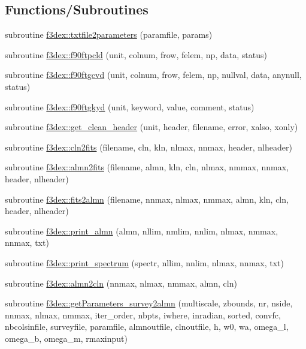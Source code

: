 \subsection*{Functions/Subroutines}
\begin{DoxyCompactItemize}
\item 
subroutine \hyperlink{namespacef3dex_a4e944841262cc3bac00e25f2d188804d}{f3dex::txtfile2parameters} (paramfile, params)
\item 
subroutine \hyperlink{namespacef3dex_a1c162e19667698db3dad6391a9bcd797}{f3dex::f90ftpcld} (unit, colnum, frow, felem, np, data, status)
\item 
subroutine \hyperlink{namespacef3dex_a8bb386e1b869c35df30978b7e634b234}{f3dex::f90ftgcvd} (unit, colnum, frow, felem, np, nullval, data, anynull, status)
\item 
subroutine \hyperlink{namespacef3dex_abb1777616669f320b1792a0e8aba490a}{f3dex::f90ftgkyd} (unit, keyword, value, comment, status)
\item 
subroutine \hyperlink{namespacef3dex_a11254efdbb3dec3e0a04346a3b4420b7}{f3dex::get\_\-clean\_\-header} (unit, header, filename, error, xalso, xonly)
\item 
subroutine \hyperlink{namespacef3dex_a9973d07e7dbafd1082de1d3b37088668}{f3dex::cln2fits} (filename, cln, kln, nlmax, nnmax, header, nlheader)
\item 
subroutine \hyperlink{namespacef3dex_a11f3efc39a60c9d26a79c13bfe936ebc}{f3dex::almn2fits} (filename, almn, kln, cln, nlmax, nmmax, nnmax, header, nlheader)
\item 
subroutine \hyperlink{namespacef3dex_a6630d20765692f55b9c5389e877e35ae}{f3dex::fits2almn} (filename, nnmax, nlmax, nmmax, almn, kln, cln, header, nlheader)
\item 
subroutine \hyperlink{namespacef3dex_aa083709f672c84c29ddbe82767394723}{f3dex::print\_\-almn} (almn, nllim, nmlim, nnlim, nlmax, nmmax, nnmax, txt)
\item 
subroutine \hyperlink{namespacef3dex_ac047f1cdd1135ef77143db2f2dc67259}{f3dex::print\_\-spectrum} (spectr, nllim, nnlim, nlmax, nnmax, txt)
\item 
subroutine \hyperlink{namespacef3dex_a0e8960adb17a10a71b92df15ba3f63d8}{f3dex::almn2cln} (nnmax, nlmax, nmmax, almn, cln)
\item 
subroutine \hyperlink{namespacef3dex_ab59d82bd4e0bbb4ce1d8149ac252b8c4}{f3dex::getParameters\_\-survey2almn} (multiscale, zbounds, nr, nside, nnmax, nlmax, nmmax, iter\_\-order, nbpts, iwhere, inradian, sorted, convfc, nbcolsinfile, surveyfile, paramfile, almnoutfile, clnoutfile, h, w0, wa, omega\_\-l, omega\_\-b, omega\_\-m, rmaxinput)

\end{DoxyCompactItemize}
